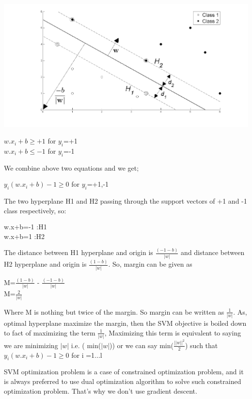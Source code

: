 \documentclass{article}
\begin{document}
	\begin{center}
	    \includegraphics[scale = 0.7]{images/svm.png}
	\end{center}
	\begin{center}
	$w.x_i + b \geq +1$  for $y_i$=+1\\
	$w.x_i + b \leq -1 $ for $y_i$=-1    
	\end{center}
	We combine above two equations and we get;
	\begin{center}
	$y_i(w.x_i + b)-1 \geq 0$  for $y_i$=+1,-1\\
	\end{center}

	The two hyperplane H1 and H2 passing through the support vectors of +1 and -1 class respectively, so:
	\begin{center}
	w.x+b=-1 :H1\\
	w.x+b=1 :H2    
	\end{center}
	The distance between H1 hyperplane and origin is $\frac{(-1-b)}{|w|}$ and distance between H2 hyperplane and origin is $\frac{(1-b)}{|w|}$. So, margin can be given as
	\begin{center}
	M=$\frac{(1-b)}{|w|}$ - $\frac{(-1-b)}{|w|}$\\
	M=$\frac{2}{|w|}$
	\end{center}
	Where M is nothing but twice of the margin. So margin can be written as $\frac{1}{|w|}$. As, optimal hyperplane maximize the margin, then the SVM objective is boiled down to fact of maximizing the term $\frac{1}{|w|}$,
	Maximizing this term is equivalent to saying we are minimizing $|w|$ i.e. ( min($|w|$))
	or we can say min($\frac{||w||^2}{2}$) such that $y_i(w.x_i + b)-1 \geq 0$ for i =1...l

	SVM optimization problem is a case of constrained optimization problem, and it is always preferred to use dual optimization algorithm to solve such constrained optimization problem. That’s why we don’t use gradient descent.
\end{document}
